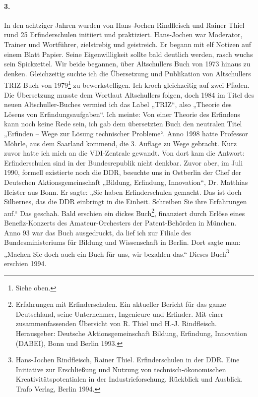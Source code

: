 \documentclass[12pt,a4paper]{article}
\begin{document}
\paragraph{3.}
In den achtziger Jahren wurden von Hans-Jochen Rindfleisch und Rainer Thiel
rund 25 Erfinderschulen initiiert und praktiziert. Hans-Jochen war Moderator,
Trainer und Wortführer, zielstrebig und geistreich. Er begann mit elf Notizen
auf einem Blatt Papier. Seine Eigenwilligkeit sollte bald deutlich werden,
rasch wuchs sein Spickzettel. Wir beide begannen, über Altschullers Buch von
1973 hinaus zu denken. Gleichzeitig suchte ich die Übersetzung und Publikation
von Altschullers TRIZ-Buch von 1979\footnote{Siehe oben.} zu bewerkstelligen.
Ich kroch gleichzeitig auf zwei Pfaden. Die Übersetzung musste dem Wortlaut
Altschullers folgen, doch 1984 im Titel des neuen Altschuller-Buches vermied
ich das Label „TRIZ“, also „Theorie des Lösens von Erfindungsaufgaben“. Ich
meinte: Von einer Theorie des Erfindens kann noch keine Rede sein, ich gab dem
übersetzten Buch den neutralen Titel „Erfinden – Wege zur Lösung technischer
Probleme“. Anno 1998 hatte Professor Möhrle, aus dem Saarland kommend, die
3. Auflage zu Wege gebracht. Kurz zuvor hatte ich mich an die VDI-Zentrale
gewandt. Von dort kam die Antwort: Erfinderschulen sind in der Bundesrepublik
nicht denkbar.  Zuvor aber, im Juli 1990, formell existierte noch die DDR,
besuchte uns in Ostberlin der Chef der Deutschen Aktionsgemeinschaft „Bildung,
Erfindung, Innovation“, Dr. Matthias Heister aus Bonn. Er sagte: „Sie haben
Erfinderschulen gemacht.  Das ist doch Silbernes, das die DDR einbringt in die
Einheit.  Schreiben Sie ihre Erfahrungen auf.“ Das geschah. Bald erschien ein
dickes Buch\footnote{Erfahrungen mit Erfinderschulen. Ein aktueller Bericht
  für das ganze Deutschland, seine Unternehmer, Ingenieure und Erfinder. Mit
  einer zusammenfassenden Übersicht von R. Thiel und H.-J. Rindfleisch.
  Herausgeber: Deutsche Aktionsgemeinschaft Bildung, Erfindung, Innovation
  (DABEI), Bonn und Berlin 1993.}, finanziert durch Erlöse eines
Benefiz-Konzerts des Amateur-Orchesters der Patent-Behörden in München. Anno
93 war das Buch ausgedruckt, da lief ich zur Filiale des Bundesministeriums
für Bildung und Wissenschaft in Berlin.  Dort sagte man: „Machen Sie doch auch
ein Buch für uns, wir bezahlen das.“ Dieses Buch\footnote{Hans-Jochen
  Rindfleisch, Rainer Thiel. Erfinderschulen in der DDR. Eine Initiative zur
  Erschließung und Nutzung von technisch-ökonomischen Kreativitätspotentialen
  in der Industrieforschung.  Rückblick und Ausblick.  Trafo Verlag, Berlin
  1994.}  erschien 1994.
\end{document}
